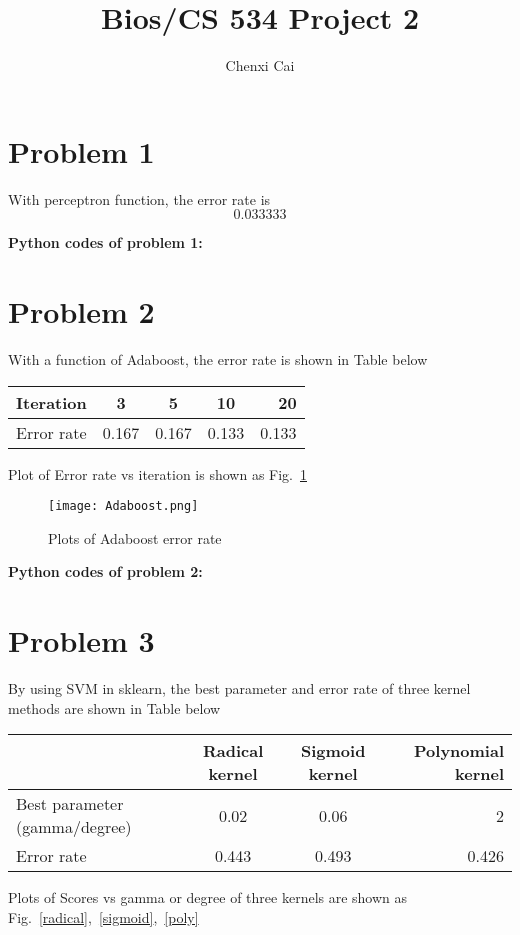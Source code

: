 \documentclass{article}
\title{ Bios/CS 534 Project 2}
\author{Chenxi Cai}
\begin{document}
\maketitle
\section{Problem 1}
With perceptron function, the error rate is
 			\begin{equation}
				0.033333  
				\end{equation} 

\textbf{Python codes of problem 1:}


\section{Problem 2}
 With a function of Adaboost, the error rate is shown in Table below
 \begin{center}
\label{Adaboost}
\begin{tabular}{  l | c | c | c | r }

\hline
Iteration & 3 & 5 & 10 & 20 \\
\hline
Error rate & 0.167 & 0.167 & 0.133 & 0.133 \\
\hline
 \end{tabular}
\end{center}
Plot of Error rate vs iteration is shown as Fig.~\ref{Adaboost}
\begin{figure}[h]
    		\texttt{[image: Adaboost.png]}
		\centering
		\caption{Plots of Adaboost error rate}
		\label{Adaboost}
    		\end{figure}

\newpage
\textbf{Python codes of problem 2:}


 
 \section{Problem 3}
 By using SVM in sklearn, the best parameter and error rate of three kernel methods are shown in Table  below
 
 \begin{center}
\label{SVM}
\begin{tabular}{  l | c |  c |  r }
\hline
     & Radical kernel  & Sigmoid kernel & Polynomial kernel  \\
\hline
Best parameter (gamma/degree)  & 0.02  & 0.06 & 2  \\
\hline
Error rate & 0.443 & 0.493 & 0.426 \\
\hline
 \end{tabular}
\end{center}
Plots of Scores vs gamma or degree of three kernels are shown as Fig.~\ref{radical},~\ref{sigmoid},~\ref{poly}
 
\end{document}
